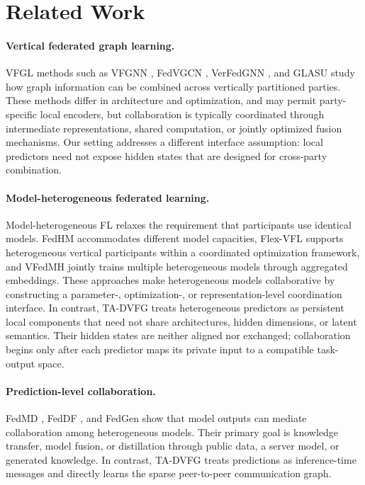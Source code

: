 \documentclass[letterpaper]{article} %
\newcommand{\method}{\textsc{TA-DVFG}}
\begin{document}
\section{Related Work}

\paragraph{Vertical federated graph learning.}
VFGL methods such as VFGNN \cite{chen2022vfgnn}, FedVGCN
\cite{ni2021fedvgcn}, VerFedGNN \cite{mai2023verfedgnn}, and GLASU
\cite{zhang2023glasu} study how graph information can be combined across
vertically partitioned parties. These methods differ in architecture and
optimization, and may permit party-specific local encoders, but collaboration
is typically coordinated through intermediate representations, shared
computation, or jointly optimized fusion mechanisms. Our setting addresses a
different interface assumption: local predictors need not expose hidden states
that are designed for cross-party combination.

\paragraph{Model-heterogeneous federated learning.}
Model-heterogeneous FL relaxes the requirement that participants use identical
models. FedHM \cite{yao2025fedhm} accommodates different model capacities,
Flex-VFL \cite{castiglia2024flexvfl} supports heterogeneous vertical
participants within a coordinated optimization framework, and VFedMH
\cite{wang2023vfedmh} jointly trains multiple heterogeneous models through
aggregated embeddings. These approaches make heterogeneous models
collaborative by constructing a parameter-, optimization-, or
representation-level coordination interface. In contrast, \method{} treats
heterogeneous predictors as persistent local components that need not share
architectures, hidden dimensions, or latent semantics. Their hidden states are
neither aligned nor exchanged; collaboration begins only after each predictor
maps its private input to a compatible task-output space.

\paragraph{Prediction-level collaboration.}
FedMD \cite{li2019fedmd}, FedDF \cite{lin2020feddf}, and FedGen
\cite{zhu2021fedgen} show that model outputs can mediate collaboration among
heterogeneous models. Their primary goal is knowledge transfer, model fusion, or
distillation through public data, a server model, or generated knowledge.
In contrast, \method{} treats predictions as inference-time messages and
directly learns the sparse peer-to-peer communication graph.
\end{document}
